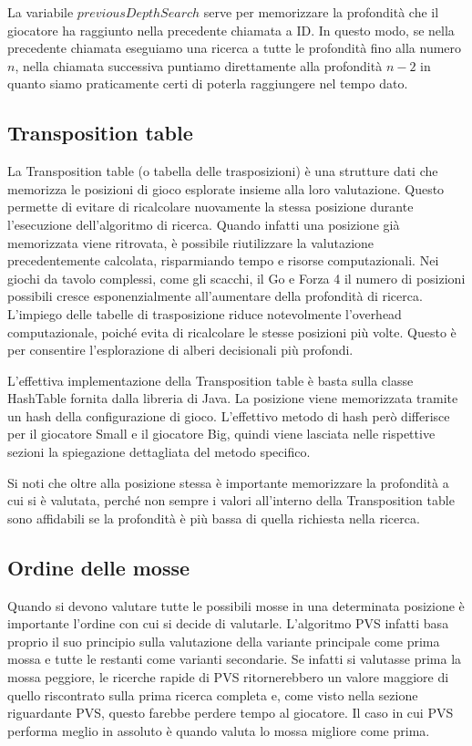 \documentclass[a4paper]{article}
\begin{document}
La variabile $previousDepthSearch$ serve per memorizzare la profondità che il
giocatore ha raggiunto nella precedente chiamata a ID. In questo modo, se nella
precedente chiamata eseguiamo una ricerca a tutte le profondità fino alla numero 
$n$, nella chiamata successiva puntiamo direttamente alla profondità $n - 2$ in 
quanto siamo praticamente certi di poterla raggiungere nel tempo dato.


\subsection{Transposition table}
\label{sec_transpositionTable}
La Transposition table (o tabella delle trasposizioni) è una strutture dati 
che memorizza le posizioni di gioco esplorate insieme alla loro valutazione. 
Questo permette di evitare di ricalcolare nuovamente la stessa posizione durante 
l'esecuzione dell'algoritmo di ricerca. Quando infatti una posizione già 
memorizzata viene ritrovata, è possibile riutilizzare la valutazione 
precedentemente calcolata, risparmiando tempo e risorse computazionali.
Nei giochi da tavolo complessi, come gli scacchi, il Go e Forza 4 il numero di 
posizioni possibili cresce esponenzialmente all'aumentare della profondità di 
ricerca. L'impiego delle tabelle di trasposizione riduce notevolmente l'overhead 
computazionale, poiché evita di ricalcolare le stesse posizioni più volte. 
Questo è per consentire l'esplorazione di alberi decisionali più profondi.

L'effettiva implementazione della Transposition table è basta sulla classe
HashTable fornita dalla libreria di Java. La posizione viene memorizzata tramite
un hash della configurazione di gioco. L'effettivo metodo di hash però 
differisce per il giocatore Small e il giocatore Big, quindi viene lasciata 
nelle rispettive sezioni la spiegazione dettagliata del metodo specifico.

Si noti che oltre alla posizione stessa è importante memorizzare la profondità
a cui si è valutata, perché non sempre i valori all'interno della Transposition
table sono affidabili se la profondità è più bassa di quella richiesta nella
ricerca.

\subsection{Ordine delle mosse}
Quando si devono valutare tutte le possibili mosse in una determinata posizione
è importante l'ordine con cui si decide di valutarle. L'algoritmo PVS infatti 
basa proprio il suo principio sulla valutazione della variante principale come 
prima mossa e tutte le restanti come varianti secondarie. Se infatti si 
valutasse prima la mossa peggiore, le ricerche rapide di PVS ritornerebbero un
valore maggiore di quello riscontrato sulla prima ricerca completa e, come visto 
nella sezione riguardante PVS, questo farebbe perdere tempo al giocatore. Il 
caso in cui PVS performa meglio in assoluto è quando valuta lo mossa migliore 
come prima.
\end{document}
